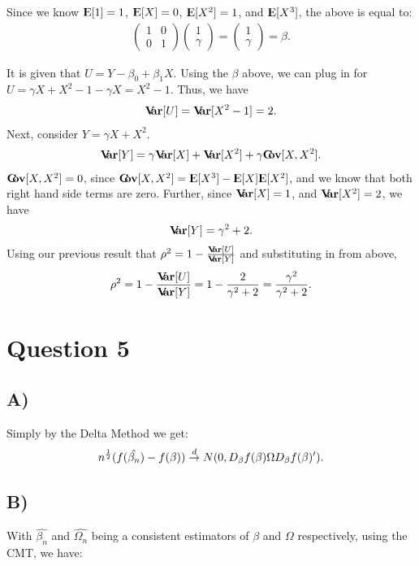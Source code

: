 \documentclass[12pt]{paper}
\newcommand{\E}{{\rm I\kern-.3em E}}
\newcommand{\Var}{{\rm \textbf{V\kern-.3em ar}}}
\newcommand{\Cov}{{\rm \textbf{C\kern-.3em ov}}}
\begin{document}
Since we know $\E[1]=1$, $\E[X]=0$, $\E[X^2]=1$, and $\E[X^3]$, the above is equal to:
\begin{align*}
\begin{pmatrix}
1 & 0\\
0 & 1
\end{pmatrix}
\begin{pmatrix}
1\\
\gamma
\end{pmatrix}
=
\begin{pmatrix}
1\\
\gamma
\end{pmatrix}=\beta.
\end{align*}

It is given that $U=Y-\beta_0+\beta_1X$. Using the $\beta$ above, we can plug in for $U=\gamma X+X^2-1-\gamma X= X^2-1$. Thus, we have
\begin{align*}
\Var[U]=\Var[X^2-1]=2.
\end{align*}
Next, consider $Y=\gamma X+X^2$.
\begin{align*}
\Var[Y]=\gamma \Var[X]+\Var[X^2]+\gamma \Cov[X,X^2].
\end{align*}
$\Cov[X,X^2]=0$, since $\Cov[X,X^2]=\E[X^3]-\E[X]\E[X^2]$, and we know that both right hand side terms are zero. Further, since $\Var[X]=1$, and $\Var[X^2]=2$, we have
\begin{align*}
\Var[Y]=\gamma^2+2.
\end{align*}
Using our previous result that $\rho^2=1-\frac{\Var[U]}{\Var[Y]}$ and substituting in from above,
\begin{align*}
\rho^2=1-\frac{\Var[U]}{\Var[Y]}=1-\frac{2}{\gamma^2+2}=\frac{\gamma^2}{\gamma^2 +2}.
\end{align*}



\section*{Question 5}

\subsection*{A)} Simply by the Delta Method we get:
\begin{align*}
n^{\frac{1}{2}}(f(\hat{\beta_n})-f(\beta))\overset{d}{\to} N(0,D_{\beta}f(\beta)\Omega D_{\beta}f(\beta)').
\end{align*}


\subsection*{B)}
With $\hat{\beta_n}$ and $\hat{\Omega_n}$ being a consistent estimators of $\beta$ and $\Omega$ respectively, using the CMT, we have:
\end{document}
